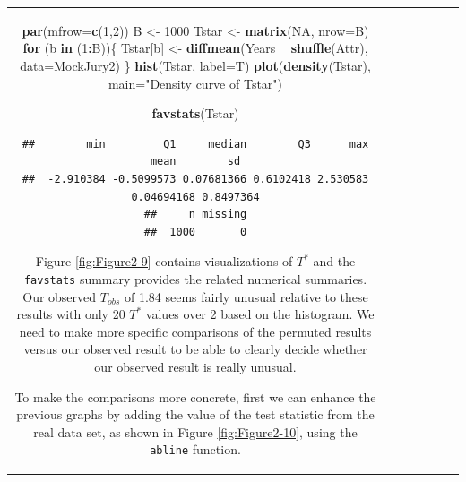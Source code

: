\documentclass[]{book}
\newenvironment{Shaded}{\begin{snugshade}}{\end{snugshade}}
\newcommand{\KeywordTok}[1]{\textcolor[rgb]{0.13,0.29,0.53}{\textbf{#1}}}
\newcommand{\DataTypeTok}[1]{\textcolor[rgb]{0.13,0.29,0.53}{#1}}
\newcommand{\DecValTok}[1]{\textcolor[rgb]{0.00,0.00,0.81}{#1}}
\newcommand{\StringTok}[1]{\textcolor[rgb]{0.31,0.60,0.02}{#1}}
\newcommand{\OtherTok}[1]{\textcolor[rgb]{0.56,0.35,0.01}{#1}}
\newcommand{\ControlFlowTok}[1]{\textcolor[rgb]{0.13,0.29,0.53}{\textbf{#1}}}
\newcommand{\OperatorTok}[1]{\textcolor[rgb]{0.81,0.36,0.00}{\textbf{#1}}}
\newcommand{\NormalTok}[1]{#1}
\theoremstyle{definition}
\theoremstyle{definition}
\theoremstyle{remark}
\begin{document}
\begin{longtable}[]{@{}ccccccc@{}}
\begin{minipage}[b]{0.10\columnwidth}
\begin{Shaded}
\begin{Highlighting}[]
\KeywordTok{par}\NormalTok{(}\DataTypeTok{mfrow=}\KeywordTok{c}\NormalTok{(}\DecValTok{1}\NormalTok{,}\DecValTok{2}\NormalTok{))}
\NormalTok{B <-}\StringTok{ }\DecValTok{1000}
\NormalTok{Tstar <-}\StringTok{ }\KeywordTok{matrix}\NormalTok{(}\OtherTok{NA}\NormalTok{, }\DataTypeTok{nrow=}\NormalTok{B)}
\ControlFlowTok{for}\NormalTok{ (b }\ControlFlowTok{in}\NormalTok{ (}\DecValTok{1}\OperatorTok{:}\NormalTok{B))\{}
\NormalTok{  Tstar[b] <-}\StringTok{ }\KeywordTok{diffmean}\NormalTok{(Years }\OperatorTok{~}\StringTok{ }\KeywordTok{shuffle}\NormalTok{(Attr), }\DataTypeTok{data=}\NormalTok{MockJury2)}
\NormalTok{\}}
\KeywordTok{hist}\NormalTok{(Tstar, }\DataTypeTok{label=}\NormalTok{T)}
\KeywordTok{plot}\NormalTok{(}\KeywordTok{density}\NormalTok{(Tstar), }\DataTypeTok{main=}\StringTok{"Density curve of Tstar"}\NormalTok{)}
\end{Highlighting}
\end{Shaded}

\begin{Shaded}
\begin{Highlighting}[]
\KeywordTok{favstats}\NormalTok{(Tstar)}
\end{Highlighting}
\end{Shaded}

\begin{verbatim}
##        min         Q1     median        Q3      max       mean        sd
##  -2.910384 -0.5099573 0.07681366 0.6102418 2.530583 0.04694168 0.8497364
##     n missing
##  1000       0
\end{verbatim}

Figure \ref{fig:Figure2-9} contains visualizations of \(T^*\) and the
\texttt{favstats} summary provides the related numerical summaries. Our
observed \(T_{obs}\) of 1.84 seems fairly unusual relative to these
results with only 20 \(T^*\) values over 2 based on the histogram. We
need to make more specific comparisons of the permuted results versus
our observed result to be able to clearly decide whether our observed
result is really unusual.

To make the comparisons more concrete, first we can enhance the previous
graphs by adding the value of the test statistic from the real data set,
as shown in Figure \ref{fig:Figure2-10}, using the \texttt{abline}
function.






\end{minipage}
\end{longtable}
\end{document}
